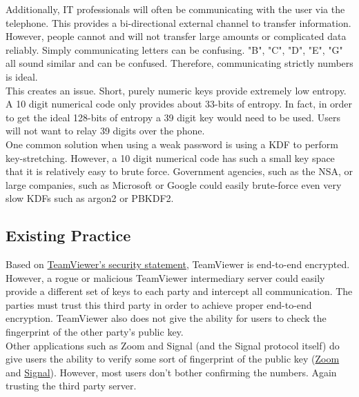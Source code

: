 \documentclass{article}
\begin{document}
    Additionally, IT professionals will often be communicating with the user via the
    telephone. This provides a bi-directional external channel to transfer
    information. However, people cannot and will not transfer large amounts or
    complicated data reliably. Simply communicating letters can be confusing. "B",
    "C", "D", "E", "G" all sound similar and can be confused. Therefore,
    communicating strictly numbers is ideal.\\

    This creates an issue. Short, purely numeric keys provide extremely low entropy.
    A 10 digit numerical code only provides about 33-bits of entropy. In fact, in
    order to get the ideal 128-bits of entropy a 39 digit key would need to be used.
    Users will not want to relay 39 digits over the phone.\\

    One common solution when using a weak password is using a KDF to perform
    key-stretching. However, a 10 digit numerical code has such a small key space
    that it is relatively easy to brute force. Government agencies, such as the NSA,
    or large companies, such as Microsoft or Google could easily brute-force even
    very slow KDFs such as argon2 or PBKDF2.\\

    \subsection{Existing Practice}

    Based on \href{https://static.teamviewer.com/resources/2017/07/TeamViewer-Security-Statement-en.pdf}{TeamViewer's
    security statement},
    TeamViewer is end-to-end encrypted. However, a rogue or malicious TeamViewer
    intermediary server could easily provide a different set of keys to each party
    and intercept all communication. The parties must trust this third party in
    order to achieve proper end-to-end encryption. TeamViewer also does not give the
    ability for users to check the fingerprint of the other party's public key.\\

    Other applications such as Zoom and Signal (and the Signal protocol itself) do
    give users the ability to verify some sort of fingerprint of the public key
    (\href{https://support.zoom.us/hc/en-us/articles/360048660871-End-to-end-E2EE-encryption-for-meetings
#h_01ENGDKFFBKTF796CE03FTCH6J}{Zoom}
    and \href{https://signal.org/blog/safety-number-updates/}{Signal}). However, most
    users don't bother confirming the numbers. Again trusting the third party
    server.\\
\end{document}

